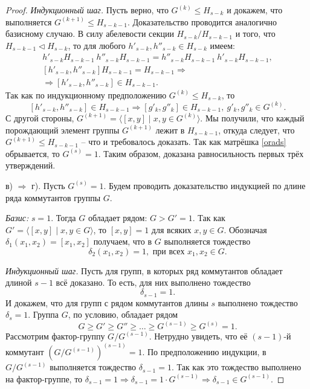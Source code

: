 \documentclass{article}
\begin{document}
\begin{proof}
    \textit{Индукционный шаг.} Пусть верно, что $G^{(k)} \leqslant H_{s - k}$ и докажем, что выполняется $G^{(k + 1)} \leqslant H_{s - k - 1}$. Доказательство проводится аналогично базисному случаю. В силу абелевости секции $H_{s - k} / H_{s - k - 1}$ и того, что $H_{s - k - 1} \triangleleft H_{s - k}$, то для любого $h'_{s - k}, h''_{s - k} \in H_{s - k}$ имеем:
    \begin{gather*}
        h'_{s - k} H_{s - k - 1} \ h''_{s - k} H_{s - k - 1} = h''_{s - k} H_{s - k - 1} \ h'_{s - k} H_{s - k - 1}, \\
        [h'_{s - k}, h''_{s - k}] H_{s - k - 1} = H_{s - k - 1} \Rightarrow \\
        \Rightarrow [h'_{s - k}, h''_{s - k}] \in H_{s - k - 1}.
    \end{gather*}
    Так как по индукционному предположению $G^{(k)} \leqslant H_{s - k}$, то $$ [h'_{s - k}, h''_{s - k}] \in H_{s - k - 1} \Rightarrow [g'_k, g''_k] \in H_{s - k - 1}, \ g'_k, g''_k \in G^{(k)}. $$
    С другой стороны, $G^{(k + 1)} = \langle [x, y] \mid x, y \in G^{(k)} \rangle$. Мы получили, что каждый порождающий элемент группы $G^{(k + 1)}$ лежит в $H_{s - k - 1}$, откуда следует, что $G^{(k + 1)} \leqslant H_{s - k - 1}$ -- что и требовалось доказать. Так как матрёшка \eqref{orads} обрывается, то $G^{(s)} = 1$. Таким образом, доказана равносильность первых трёх утверждений.

    в) $\Rightarrow$ г). Пусть $G^{(s)} = 1$. Будем проводить доказательство индукцией по длине ряда коммутантов группы $G$.

    \textit{Базис:} $s = 1$. Тогда $G$ обладает рядом: $G > G' = 1$. Так как $G' = \langle [x, y] \mid x,y \in G \rangle$, то $[x, y] = 1$ для всяких $x, y \in G$. Обозначая $\delta_1(x_1, x_2) = [x_1, x_2]$ получаем, что в $G$ выполняется тождество $$ \delta_2(x_1, x_2) = 1, \text{ при всех } x_1, x_2 \in G. $$

    \textit{Индукционный шаг.} Пусть для групп, в которых ряд коммутантов обладает длиной $s - 1$ всё доказано. То есть, для них выполнено тождество $$\delta_{s - 1} = 1. $$ И докажем, что для групп с рядом коммутантов длины $s$ выполнено тождество $\delta_s = 1$.
    Группа $G$, по условию, обладает рядом
    \[
        G \geqslant G' \geqslant G'' \geqslant \ldots \geqslant G^{(s - 1)} \geqslant G^{(s)} = 1.
    \]
    Рассмотрим фактор-группу $G / G^{(s - 1)}$. Нетрудно увидеть, что её $(s - 1)$-й коммутант $(G / G^{(s - 1)})^{(s - 1)} = 1$. По предположению индукции, в $G / G^{(s - 1)}$ выполняется тождество $\delta_{s - 1} = 1$. Так как это тождество выполнено на фактор-группе, то $\delta_{s - 1} = 1 \Rightarrow \delta_{s - 1} = 1 \cdot G^{(s - 1)} \Rightarrow \delta_{s - 1} \in G^{(s - 1)}$.


\end{proof}
\end{document}
